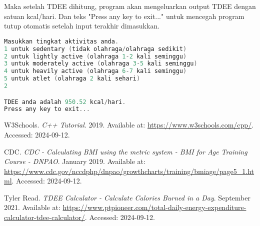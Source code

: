 \documentclass{article}
\begin{document}
Maka setelah TDEE dihitung, program akan mengeluarkan output TDEE dengan satuan kcal/hari. Dan teks "Press any key to exit..." untuk mencegah program tutup otomatis setelah input terakhir dimasukkan.
\begin{lstlisting}[language=c++]
Masukkan tingkat aktivitas anda.
1 untuk sedentary (tidak olahraga/olahraga sedikit)
2 untuk lightly active (olahraga 1-2 kali seminggu)
3 untuk moderately active (olahraga 3-5 kali seminggu)
4 untuk heavily active (olahraga 6-7 kali seminggu)
5 untuk atlet (olahraga 2 kali sehari)
2

TDEE anda adalah 950.52 kcal/hari.
Press any key to exit...
\end{lstlisting}
\begin{thebibliography}{9}

W3Schools. \textit{C++ Tutorial}. 2019. Available at: \url{https://www.w3schools.com/cpp/}. Accessed: 2024-09-12.

CDC. \textit{CDC - Calculating BMI using the metric system - BMI for Age Training Course - DNPAO}. January 2019. Available at: \url{https://www.cdc.gov/nccdphp/dnpao/growthcharts/training/bmiage/page5_1.html}. Accessed: 2024-09-12.

Tyler Read. \textit{TDEE Calculator - Calculate Calories Burned in a Day}. September 2021. Available at: \url{https://www.ptpioneer.com/total-daily-energy-expenditure-calculator-tdee-calculator/}. Accessed: 2024-09-12.

\end{thebibliography}
\end{document}

